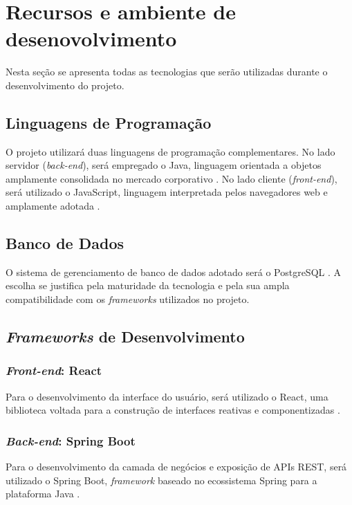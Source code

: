 \chapter{Recursos e ambiente de desenovolvimento}\label{sec:4}

Nesta seção se apresenta todas as tecnologias que serão utilizadas durante o desenvolvimento do projeto. 

\section{Linguagens de Programação}

O projeto utilizará duas linguagens de programação complementares. No lado 
servidor (\textit{back-end}), será empregado o Java, linguagem 
orientada a objetos amplamente consolidada no mercado corporativo \cite{Oracle2025}. No lado 
cliente (\textit{front-end}), será utilizado o JavaScript, linguagem 
interpretada pelos navegadores web e amplamente adotada \cite{Guo2025}.

\section{Banco de Dados}

O sistema de gerenciamento de banco de dados adotado será o 
PostgreSQL \cite{PostgreSQLGlobalDevelopmentGroup2025}. A escolha se justifica pela maturidade da tecnologia e pela sua 
ampla compatibilidade com os \textit{frameworks} utilizados no projeto.

\section{\textit{Frameworks} de Desenvolvimento}

\subsection{\textit{Front-end}: React}

Para o desenvolvimento da interface do usuário, será utilizado o 
React, uma biblioteca voltada para a construção de interfaces reativas e componentizadas \cite{ReactTeam2025}. 

\subsection{\textit{Back-end}: Spring Boot}

Para o desenvolvimento da camada de negócios e exposição de APIs REST, será 
utilizado o Spring Boot, \textit{framework} baseado no ecossistema 
Spring para a plataforma Java \cite{Webb2025}.